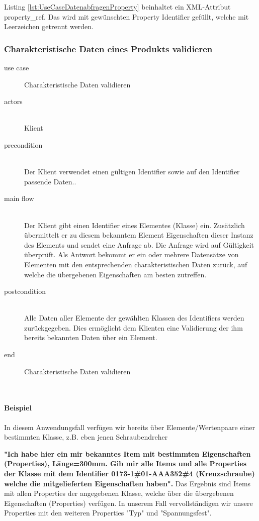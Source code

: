 Listing \ref{lst:UseCaseDatenabfragenProperty} beinhaltet ein XML-Attribut property\_ref. Das wird mit gewünschten Property Identifier gefüllt, welche mit Leerzeichen getrennt werden. 

\subsubsection{Charakteristische Daten eines Produkts validieren}

{\small

\begin{description}
     \item[use case] Charakteristische Daten validieren
     \item[  actors]~\\
     Klient
     \item[  precondition]~\\
     Der Klient verwendet einen gültigen Identifier sowie auf den Identifier passende Daten..
     \item[  main flow]~\\
     Der Klient gibt einen Identifier eines Elementes (Klasse) ein. Zusätzlich übermittelt er zu diesem bekanntem Element Eigenschaften dieser Instanz des Elements und sendet eine Anfrage ab. Die Anfrage wird auf Gültigkeit überprüft. Als Antwort bekommt er ein oder mehrere Datensätze von Elementen mit den entsprechenden charakteristischen Daten zurück, auf welche die übergebenen Eigenschaften am besten zutreffen. 
     \item[  postcondition]~\\
     Alle Daten aller Elemente der gewählten Klassen des Identifiers werden zurückgegeben. Dies ermöglicht dem Klienten eine Validierung der ihm bereits bekannten Daten über ein Element. 
     \item[end] Charakteristische Daten validieren
\end{description}

~\\

} %

\paragraph{Beispiel}

In diesem Anwendungsfall verfügen wir bereits über Elemente/Wertenpaare einer bestimmten Klasse, z.B. eben jenen Schraubendreher

\textbf{"Ich habe hier ein mir bekanntes Item mit bestimmten Eigenschaften (Properties), Länge=300mm. Gib mir alle Items und alle Properties der Klasse mit dem Identifier 0173-1\#01-AAA352\#4 (Kreuzschraube) welche die mitgelieferten Eigenschaften haben".}
Das Ergebnis sind Items mit allen Properties der angegebenen Klasse, welche über die übergebenen Eigenschaften (Properties) verfügen. In unserem Fall vervollständigen wir unsere Properties mit den weiteren Properties "Typ" und "Spannungsfest".

